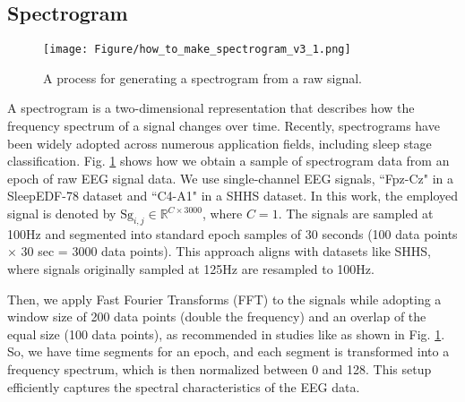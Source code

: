 
\subsection{Spectrogram}
\label{Preliminary}

\begin{figure}
\centerline{\texttt{[image: Figure/how\_to\_make\_spectrogram\_v3\_1.png]}} 
\caption{A process for generating a spectrogram from a raw signal.}

\label{how_to_make_spectrogram}
\vspace{-15pt}
\end{figure}

A spectrogram is a two-dimensional representation that describes how the frequency spectrum of a signal changes over time.
Recently, spectrograms have been widely adopted across numerous application fields, including sleep stage classification.
%
%
Fig. \ref{how_to_make_spectrogram} shows how we obtain a sample of spectrogram data from an epoch of raw EEG signal data. We use single-channel EEG signals, ``Fpz-Cz" in a SleepEDF-78 dataset and ``C4-A1" in a SHHS dataset.
In this work, the employed signal is denoted by $\text{Sg}_{i,j} \in \mathbb{R}^{C \times 3000}$, where $C=1$. The signals are sampled at 100Hz and segmented into standard epoch samples of 30 seconds (100 data points $\times$ 30 sec = 3000 data points).
This approach aligns with datasets like SHHS, where signals originally sampled at 125Hz are resampled to 100Hz.

Then, we apply Fast Fourier Transforms (FFT) to the signals while adopting a window size of 200 data points (double the frequency) and an overlap of the equal size (100 data points), as recommended in studies like \cite{phan2021xsleepnet,kontras2023coresleep} as shown in Fig. \ref{how_to_make_spectrogram}. So, we have  time segments for an epoch, and each segment is transformed into a frequency spectrum, which is then normalized between 0 and 128. This setup efficiently captures the spectral characteristics of the EEG data. 

